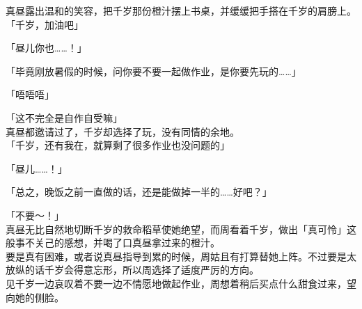真昼露出温和的笑容，把千岁那份橙汁摆上书桌，并缓缓把手搭在千岁的肩膀上。\\

「千岁，加油吧」

「昼儿你也……！」

「毕竟刚放暑假的时候，问你要不要一起做作业，是你要先玩的……」

「唔唔唔」

「这不完全是自作自受嘛」\\

真昼都邀请过了，千岁却选择了玩，没有同情的余地。\\

「千岁，还有我在，就算剩了很多作业也没问题的」

「昼儿……！」

「总之，晚饭之前一直做的话，还是能做掉一半的……好吧？」

「不要～！」\\

真昼无比自然地切断千岁的救命稻草使她绝望，而周看着千岁，做出「真可怜」这般事不关己的感想，并喝了口真昼拿过来的橙汁。\\

要是真有困难，或者说真昼指导到累的时候，周姑且有打算替她上阵。不过要是太放纵的话千岁会得意忘形，所以周选择了适度严厉的方向。\\

见千岁一边哀叹着不要一边不情愿地做起作业，周想着稍后买点什么甜食过来，望向她的侧脸。
